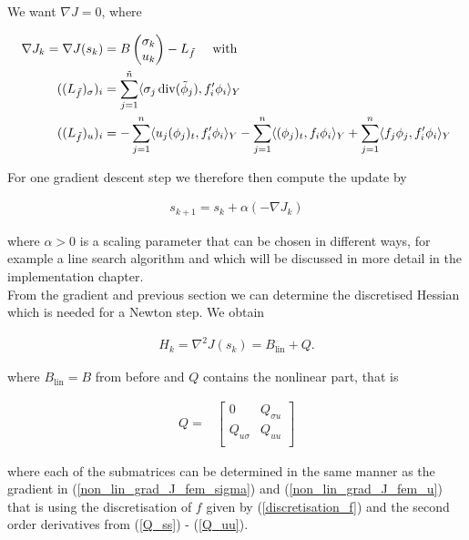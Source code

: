 \documentclass[../draft_1.tex]{subfiles}
\begin{document}
We want $\nabla J = 0$, where

\begin{ceqn}
	\begin{align}
		\nabla J_k = \nabla J(s_k) &= B \begin{pmatrix}
	\sigma_k \\
	u_k
	\end{pmatrix} - L_{\tilde{f}} \quad \text{ with } \\
	\label{non_lin_grad_J_fem_sigma}
 ((L_{\tilde{f}})_{\sigma})_i &= \sum_{j=1}^{\tilde{n}} \langle \sigma_j \mathop{}\!\mathrm{div}(\tilde{\phi}_j), f'_i \phi_i \rangle_Y \\
 	\label{non_lin_grad_J_fem_u}
  ((L_{\tilde{f}})_{u})_i &= - \sum_{j=1}^n \langle u_j (\phi_j)_t, f'_i \phi_i \rangle_Y - \sum_{j=1}^{n} \langle (\phi_j)_t, f_i \phi_i \rangle_Y  + \sum_{j=1}^n \langle f_j \phi_j, f'_i \phi_i \rangle_Y \\
	\end{align}
\end{ceqn}
For one gradient descent step we therefore then compute the update by 
\begin{ceqn}
	\begin{align}
s_{k+1} = s_k + \alpha (-\nabla J_k)
	\end{align}
\end{ceqn}
where $\alpha > 0$ is a scaling parameter that can be chosen in different ways, for example a line search algorithm and which will be discussed in more detail in the implementation chapter. 
\smallskip
\\
From the gradient and previous section we can determine the discretised Hessian which is needed for a Newton step. We obtain 
\begin{ceqn}
	\begin{align}
	H_k = \nabla^2 J(s_k) = B_{\text{lin}} + Q.
	\end{align}
\end{ceqn}
where $B_{\text{lin}} = B$ from before and $Q$ contains the nonlinear part, that is
\begin{ceqn}
	\begin{align}
	Q =& 
	\begin{bmatrix}
	0 &  Q_{\sigma u}  \\
	 Q_{u \sigma}  &    Q_{uu} \\
	\end{bmatrix}
		\end{align}
\end{ceqn}
where each of the submatrices can be determined in the same manner as the gradient in (\ref{non_lin_grad_J_fem_sigma}) and (\ref{non_lin_grad_J_fem_u}) that is using the discretisation of $f$ given by (\ref{discretisation_f}) and the second order derivatives from (\ref{Q_ss}) - (\ref{Q_uu}).
\end{document}
